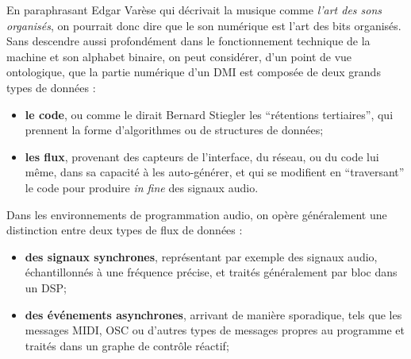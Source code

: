\noindent En paraphrasant Edgar Varèse qui décrivait la musique comme \textit{l'art des sons organisés}, on pourrait donc dire que le son numérique est l'art des bits organisés. Sans descendre aussi profondément dans le fonctionnement technique de la machine et son alphabet binaire, on peut considérer, d'un point de vue ontologique, que la partie numérique d'un \gls{DMI} est composée de deux grands types de données :
\vspace{-1em}
\begin{itemize}[noitemsep]
	\item \textbf{le code}, ou comme le dirait Bernard Stiegler les ``rétentions tertiaires'', qui prennent la forme d'algorithmes ou de structures de données;
	\item \textbf{les flux}, provenant des capteurs de l'interface, du réseau, ou du code lui même, dans sa capacité à les auto-générer, et qui se modifient en ``traversant'' le code pour produire \textit{in fine} des signaux audio.
\end{itemize}
\noindent Dans les environnements de programmation audio, on opère généralement une distinction entre deux types de flux de données : 
\vspace{-1em}
\begin{itemize}[noitemsep]
	\item \textbf{des signaux synchrones}, représentant par exemple des signaux audio, échantillonnés à une fréquence précise, et traités généralement par bloc dans un \gls{DSP};
	\item \textbf{des événements asynchrones}, arrivant de manière sporadique, tels que les messages \gls{MIDI}, \gls{OSC} ou d'autres types de messages propres au programme et traités dans un graphe de contrôle réactif;
\end{itemize}

